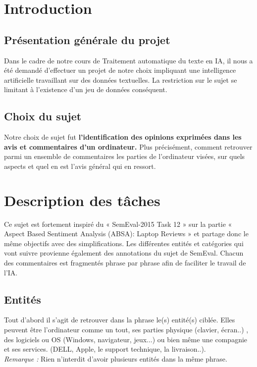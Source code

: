 \documentclass[12pt ,a4paper ]{article}
\begin{document}
\begin{multicols}{2} 
\section{Introduction}

	\subsection{Présentation générale du projet}
		Dans le cadre de notre cours de Traitement automatique du texte en IA, il nous a été demandé d'effectuer un projet de notre choix impliquant une intelligence artificielle travaillant sur des données textuelles. La restriction sur le sujet se limitant à l'existence d'un jeu de données conséquent.
	
	\subsection{Choix du sujet}
		Notre choix de sujet fut \textbf{l'identification des opinions exprimées dans les avis et commentaires d’un ordinateur.} Plus précisément, comment retrouver parmi un ensemble de commentaires les parties de l'ordinateur visées,  sur quels aspects et quel en est l'avis général qui en ressort. 
		
\section{Description des tâches}
Ce sujet est fortement inspiré du « SemEval-2015 Task 12 » sur la partie « Aspect Based Sentiment Analysis (ABSA): Laptop Reviews » et partage donc le même objectifs avec des simplifications. Les différentes entités et catégories qui vont suivre provienne également des annotations du sujet de SemEval. Chacun des commentaires est fragmentés phrase par phrase afin de faciliter le travail de l'IA. 
		
\subsection{Entités}
\noindent Tout d'abord il s'agit de retrouver dans la phrase le(s) entité(s) ciblée. Elles peuvent être l'ordinateur comme un tout, ses parties physique (clavier, écran..) , des logiciels ou OS (Windows, navigateur, jeux...) ou bien même une compagnie et ses services. (DELL, Apple, le support technique, la livraison..).\\

\noindent\textit{Remarque : } Rien n'interdit d'avoir plusieurs entités dans la même phrase.\\
		

\end{multicols}
\end{document}
